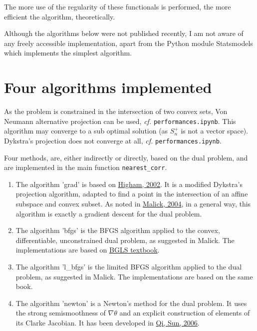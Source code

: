 \documentclass{article}
\begin{document}
\medskip

The more use of the regularity of these functionals is performed, the more efficient the algorithm, theoretically.

\medskip

Although the algorithms below were not published recently, I am not aware of any freely accessible implementation, apart from the Python module Statsmodels which implements the simplest algorithm.

\section{Four algorithms implemented}

As the problem is constrained in the intersection of two convex sets, Von Neumann alternative projection can be used, \emph{cf.} \texttt{performances.ipynb}. This algorithm may converge to a sub optimal solution (as $S_n^+$ is not a vector space). Dykstra's projection does not converge at all, \emph{cf.} \texttt{performances.ipynb}.

\medskip

Four methods, are, either indirectly or directly, based on the dual problem, and are implemented in the main function \texttt{nearest\_corr}.
\begin{enumerate}
\item The algorithm 'grad' is based on \href{https://www.maths.manchester.ac.uk/~higham/narep/narep369.pdf}{Higham, 2002}. It is a modified Dykstra's projection algorithm, adapted to find a point in the intersection of an affine subspace and convex subset. As noted in \href{https://hal.inria.fr/inria-00072409v2/document}{Malick, 2004}, in a general way, this algorithm is exactly a gradient descent for the dual problem.
\item The algorithm 'bfgs' is the BFGS algorithm applied to the convex, differentiable, unconstrained dual problem, as suggested in Malick. The implementations are based on \href{https://link.springer.com/book/10.1007/978-3-540-35447-5}{BGLS textbook}.
\item The algorithm 'l\_bfgs' is the limited BFGS algorithm applied to the dual problem, as suggested in Malick. The implementations are based on the same book.
\item The algorithm 'newton' is a Newton's method for the dual problem. It uses the strong semismoothness of $\nabla \theta$ and an explicit construction of elements of its Clarke Jacobian. It has been developed in \href{http://www.personal.soton.ac.uk/hdqi/REPORTS/simax_06.pdf}{Qi, Sun, 2006}.
\end{enumerate}
\end{document}
